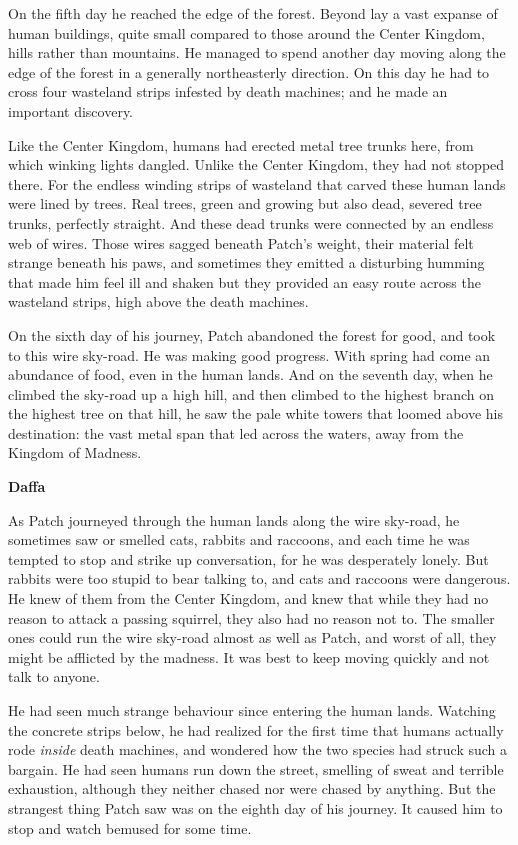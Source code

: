 \documentclass[11pt]{article}
\begin{document}
 On the fifth day he reached the edge of the forest. Beyond lay a vast expanse of human buildings, quite small compared to those around the Center Kingdom, hills rather than mountains. He managed to spend another day moving along the edge of the forest in a generally northeasterly direction. On this day he had to cross four wasteland strips infested by death machines; and he made an important discovery.\par
 Like the Center Kingdom, humans had erected metal tree trunks here, from which winking lights dangled. Unlike the Center Kingdom, they had not stopped there. For the endless winding strips of wasteland that carved these human lands were lined by trees. Real trees, green and growing %
 but also dead, severed tree trunks, perfectly straight. And these dead trunks were connected by an endless web of wires. Those wires sagged beneath Patch's weight, their material felt strange beneath his paws, and sometimes they emitted a disturbing humming that made him feel ill and shaken %
 but they provided an easy route across the wasteland strips, high above the death machines.\par
 On the sixth day of his journey, Patch abandoned the forest for good, and took to this wire sky-road. He was making good progress. With spring had come an abundance of food, even in the human lands. And on the seventh day, when he climbed the sky-road up a high hill, and then climbed to the highest branch on the highest tree on that hill, he saw the pale white towers that loomed above his destination: the vast metal span that led across the waters, away from the Kingdom of Madness.\par
\par
{\bf Daffa\par
}\par
As Patch journeyed through the human lands along the wire sky-road, he sometimes saw or smelled cats, rabbits and raccoons, and each time he was tempted to stop and strike up conversation, for he was desperately lonely. But rabbits were too stupid to bear talking to, and cats and raccoons were dangerous. He knew of them from the Center Kingdom, and knew that while they had no reason to attack a passing squirrel, they also had no reason not to. The smaller ones could run the wire sky-road almost as well as Patch, and worst of all, they might be afflicted by the madness. It was best to keep moving quickly and not talk to anyone.\par
 He had seen much strange behaviour since entering the human lands. Watching the concrete strips below, he had realized for the first time that humans actually rode {\it inside} death machines, and wondered how the two species had struck such a bargain. He had seen humans run down the street, smelling of sweat and terrible exhaustion, although they neither chased nor were chased by anything. But the strangest thing Patch saw was on the eighth day of his journey. It caused him to stop and watch bemused for some time.\par
\end{document}

